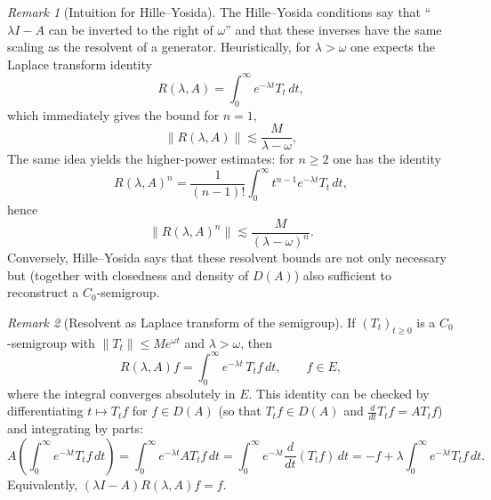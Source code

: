 \documentclass[11pt]{article}
\theoremstyle{definition}
\theoremstyle{remark}
\newtheorem{remark}{Remark}
\begin{document}
\begin{remark}[Intuition for Hille--Yosida]
The Hille--Yosida conditions say that ``$\lambda I-A$ can be inverted to the right of $\omega$'' and that these inverses have the same scaling as the resolvent of a generator.
Heuristically, for $\lambda>\omega$ one expects the Laplace transform identity
\[
    R(\lambda,A) = \int_0^\infty e^{-\lambda t}T_t\,dt,
\]
which immediately gives the bound for $n=1$,
\[
    \|R(\lambda,A)\| \lesssim \frac{M}{\lambda-\omega},
\]
The same idea yields the higher-power estimates: for $n\ge 2$ one has the identity
\[
    R(\lambda,A)^n
    =
    \frac{1}{(n-1)!}\int_0^\infty t^{n-1}e^{-\lambda t}T_t\,dt,
\]
hence
\[
    \|R(\lambda,A)^n\| \lesssim \frac{M}{(\lambda-\omega)^n}.
\]
Conversely, Hille--Yosida says that these resolvent bounds are not only necessary but (together with closedness and density of $D(A)$) also sufficient to reconstruct a $C_0$-semigroup.
\end{remark}

\begin{remark}[Resolvent as Laplace transform of the semigroup]
If $(T_t)_{t\ge 0}$ is a $C_0$-semigroup with $\|T_t\|\le M e^{\omega t}$ and $\lambda>\omega$, then
\[
    R(\lambda,A)f
    =
    \int_0^\infty e^{-\lambda t}\,T_t f\,dt,
    \qquad f\in E,
\]
where the integral converges absolutely in $E$.
This identity can be checked by differentiating $t\mapsto T_t f$ for $f\in D(A)$ (so that $T_t f\in D(A)$ and $\frac{d}{dt}T_t f = AT_t f$)
and integrating by parts:
\[
    A\!\left(\int_0^\infty e^{-\lambda t}T_t f\,dt\right)
    =
    \int_0^\infty e^{-\lambda t}AT_t f\,dt
    =
    \int_0^\infty e^{-\lambda t}\frac{d}{dt}(T_t f)\,dt
    =
    -f + \lambda \int_0^\infty e^{-\lambda t}T_t f\,dt.
\]
Equivalently, $(\lambda I-A)R(\lambda,A)f=f$.
\end{remark}
\end{document}
